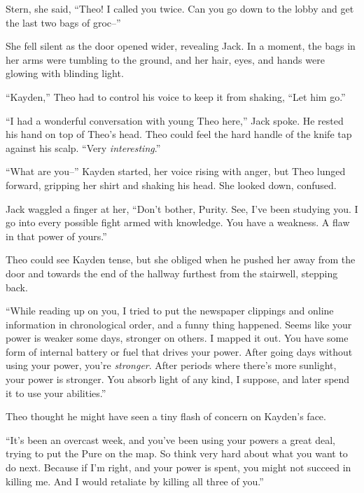 Stern, she said, ``Theo!  I called you twice.  Can you go down to the lobby and get the last two bags of groc--''



She fell silent as the door opened wider, revealing Jack.  In a moment, the bags in her arms were tumbling to the ground, and her hair, eyes, and hands were glowing with blinding light.



``Kayden,'' Theo had to control his voice to keep it from shaking, ``Let him go.''



``I had a wonderful conversation with young Theo here,'' Jack spoke.  He rested his hand on top of Theo's head.  Theo could feel the hard handle of the knife tap against his scalp.  ``Very \emph{interesting}.''



``What are you--'' Kayden started, her voice rising with anger, but Theo lunged forward, gripping her shirt and shaking his head.  She looked down, confused.



Jack waggled a finger at her, ``Don't bother, Purity.  See, I've been studying you.  I go into every possible fight armed with knowledge.  You have a weakness.  A flaw in that power of yours.''



Theo could see Kayden tense, but she obliged when he pushed her away from the door and towards the end of the hallway furthest from the stairwell, stepping back.



``While reading up on you, I tried to put the newspaper clippings and online information in chronological order, and a funny thing happened.  Seems like your power is weaker some days, stronger on others.  I mapped it out.  You have some form of internal battery or fuel that drives your power.  After going days without using your power, you're \emph{stronger}.  After periods where there's more sunlight, your power is stronger.  You absorb light of any kind, I suppose, and later spend it to use your abilities.''



Theo thought he might have seen a tiny flash of concern on Kayden's face.



``It's been an overcast week, and you've been using your powers a great deal, trying to put the Pure on the map.  So think very hard about what you want to do next.  Because if I'm right, and your power is spent, you might not succeed in killing me.  And I would retaliate by killing all three of you.''



